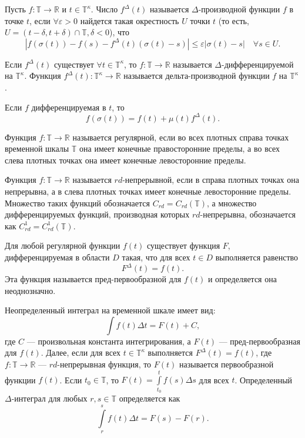 \begin{definition}
    Пусть $f:\mathbb{T} \rightarrow \mathbb{R}$ и $t \in \mathbb{T}^\kappa$.
    Число $f^{\Delta}(t)$ называется $\Delta$-производной функции $f$ в точке $t$,
    если $\forall \varepsilon > 0$ найдется такая окрестность
    $U$ точки $t$ (то есть, $U = (t - \delta, t + \delta) \cap \mathbb{T}, \delta < 0$),
    что
    \[
    \left|f(\sigma(t)) - f(s) - f^{\Delta}(t)(\sigma(t)-s)\right| \leqslant
        \varepsilon\left|\sigma(t) - s\right| \quad \forall s \in U.
    \]
\end{definition}

\begin{definition}
    Если $f^{\Delta}(t)$ существует $\forall t \in \mathbb{T}^\kappa$,
    то $f:\mathbb{T} \rightarrow \mathbb{R}$ называется $\Delta$-дифферен\-ци\-ру\-емой
    на $\mathbb{T}^\kappa$. Функция $f^{\Delta}(t): \mathbb{T}^\kappa \rightarrow \mathbb{R}$
    называется дельта-производной функции $f$ на $\mathbb{T}^\kappa$.
\end{definition}

Если $f$ дифференцируемая в $t$, то
\[
    f(\sigma(t)) = f(t) + \mu(t)f^{\Delta}(t).
\]

\begin{definition}
    Функция $f:\mathbb{T} \rightarrow \mathbb{R}$ называется регулярной,
    если во всех плотных справа точках временной шкалы $\mathbb{T}$ она имеет
    конечные правосторонние пределы, а во всех слева плотных точках она имеет
    конечные левосторонние пределы.
\end{definition}

\begin{definition}
    Функция $f:\mathbb{T} \rightarrow \mathbb{R}$ называется $rd$-непрерывной,
    если в справа плотных точках она непрерывна, а в слева плотных точках имеет
    конечные левосторонние пределы. Множество таких функций обозначается
    $C_{rd} = C_{rd}(\mathbb{T})$, а множество дифференцируемых функций,
    производная которых $rd$-непрерывна, обозначается как
    $C_{rd}^1 = C_{rd}^1(\mathbb{T})$.
\end{definition}


\begin{definition}
Для любой регулярной функции $f(t)$ существует функция $F$,
дифференцируемая в области $D$ такая, что для всех $t \in D$
выполняется равенство $$F^{\Delta}(t) = f(t).$$
Эта функция называется пред-первообразной для $f(t)$ и
определяется она неоднозначно.
\end{definition}

Неопределенный интеграл на временной шкале имеет вид:
\[
    \int{f(t) \Delta t} = F(t) + C,
\]
где $C$ --- произвольная константа интегрирования, а $F(t)$ --- пред-перво\-образ\-ная для $f(t)$.
Далее, если для всех $t \in \mathbb{T}^\kappa$ выполняется $F^{\Delta}(t) =
f(t)$, где $f:\mathbb{T}\rightarrow\mathbb{R}$ --- $rd$-непрерывная функция, то
$F(t)$ называется первообразной функции $f(t)$. Если $t_0 \in \mathbb{T}$, то
$\displaystyle F(t) = \int\limits_{t_0}^t{f(s) \Delta s}$ для всех $t$.
Определенный $\Delta$-интеграл для любых $r,s \in \mathbb{T}$ определяется как
\[
    \int\limits_r^s{f(t)\Delta t} = F(s) - F(r).
\]
